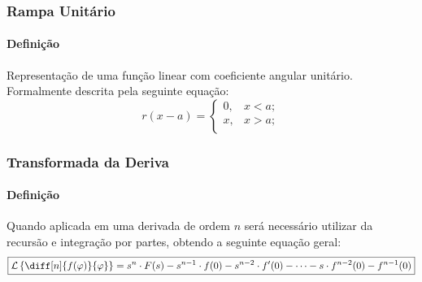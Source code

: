 \documentclass{article}
\begin{document}
\subsubsection{Rampa Unitário}
    \paragraph{Definição}Representação de uma função linear com coeficiente angular unitário. Formalmente descrita pela seguinte equação:
    \begin{equation}
        \boxed{
            r(x - a) = 
            \begin{cases}
                0, & x < a;\\
                x, & x > a;\\
            \end{cases}
        }
    \end{equation}

\subsubsection{Transformada da Deriva}
    \paragraph{Definição}Quando aplicada em uma derivada de ordem $n$ será necessário utilizar da recursão e integração por partes, obtendo a seguinte equação geral:
    \begin{equation}
        \boxed{
            \mathcal{L}\left\{\diff[n]{f(\varphi)}{\varphi}\right\} = 
            s^{n}\cdot F(s) - 
            s^{n-1} \cdot f(0) - 
            s^{n-2} \cdot f'(0) - \dots - 
            s \cdot f^{n-2}(0) - 
            f^{n-1}(0)
        }
    \end{equation}
\end{document}
